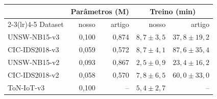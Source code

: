 \begin{tabular}{l rr rr}
\toprule
& \multicolumn{2}{c}{Parâmetros (M)} & \multicolumn{2}{c}{Treino (min)} \\
\cmidrule(lr){2-3}\cmidrule(lr){4-5}
Dataset & nosso & artigo & nosso & artigo \\
\midrule
UNSW-NB15-v3 & 0,100 & 0,874 & $8,7 \pm 3,5$ & $37,8 \pm 19,2$ \\
CIC-IDS2018-v3 & 0,059 & 0,572 & $8,7 \pm 4,1$ & $87,6 \pm 35,4$ \\
UNSW-NB15-v2 & 0,093 & 0,867 & $2,5 \pm 0,9$ & $23,4 \pm 16,2$ \\
CIC-IDS2018-v2 & 0,058 & 0,570 & $7,8 \pm 6,5$ & $60,0 \pm 33,0$ \\
\midrule
ToN-IoT-v3 & 0,100 & -- & $5,4 \pm 2,7$ & -- \\
\bottomrule
\end{tabular}
